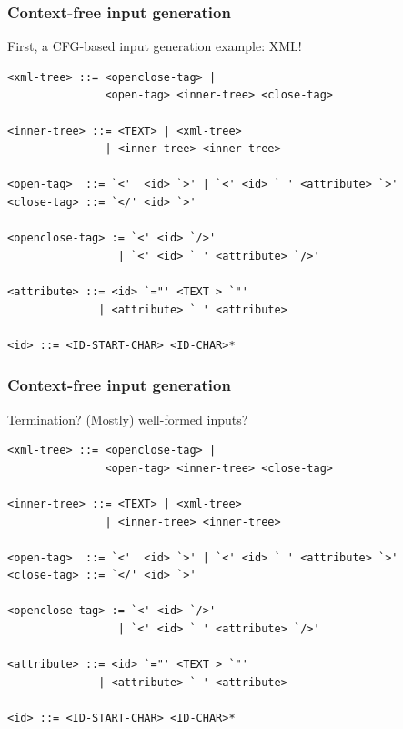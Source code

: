 \documentclass[11pt,xcolor={dvipsnames},hyperref={pdftex,pdfpagemode=UseNone,hidelinks,pdfdisplaydoctitle=true},usepdftitle=false]{beamer}
\begin{document}
\begin{frame}[fragile]
    \frametitle{Context-free input generation} 
  First, a CFG-based input generation example: XML! \\[4pt]\pause
\begin{lstlisting}[style=goblin]
<xml-tree> ::= <openclose-tag> | 
               <open-tag> <inner-tree> <close-tag>
               
<inner-tree> ::= <TEXT> | <xml-tree> 
               | <inner-tree> <inner-tree> 
                     
<open-tag>  ::= `<'  <id> `>' | `<' <id> ` ' <attribute> `>'
<close-tag> ::= `</' <id> `>'

<openclose-tag> := `<' <id> `/>' 
                 | `<' <id> ` ' <attribute> `/>'

<attribute> ::= <id> `="' <TEXT > `"' 
              | <attribute> ` ' <attribute> 
                    
<id> ::= <ID-START-CHAR> <ID-CHAR>* 
\end{lstlisting}
\end{frame}

\begin{frame}[fragile]
    \frametitle{Context-free input generation} 
Termination? (Mostly) well-formed inputs?
\begin{lstlisting}[style=goblin]
<xml-tree> ::= <openclose-tag> | 
               <open-tag> <inner-tree> <close-tag>
               
<inner-tree> ::= <TEXT> | <xml-tree> 
               | <inner-tree> <inner-tree> 
                     
<open-tag>  ::= `<'  <id> `>' | `<' <id> ` ' <attribute> `>'
<close-tag> ::= `</' <id> `>'

<openclose-tag> := `<' <id> `/>' 
                 | `<' <id> ` ' <attribute> `/>'

<attribute> ::= <id> `="' <TEXT > `"' 
              | <attribute> ` ' <attribute> 
                    
<id> ::= <ID-START-CHAR> <ID-CHAR>* 
\end{lstlisting}
\end{frame}
\end{document}
